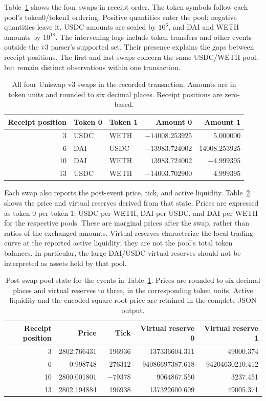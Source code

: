 \documentclass[11pt]{article}
\begin{document}
Table~\ref{tab:example} shows the four swaps in receipt order. The token symbols
follow each pool's token0/token1 ordering. Positive quantities enter the pool;
negative quantities leave it. USDC amounts are scaled by $10^6$, and DAI and WETH
amounts by $10^{18}$. The intervening logs include token transfers and other events
outside the v3 parser's supported set. Their presence explains the gaps between
receipt positions. The first and last swaps concern the same USDC/WETH pool, but
remain distinct observations within one transaction.

\begin{table}[!htbp]
\centering
\small
\begin{tabular}{rllrr}
\toprule
Receipt position & Token 0 & Token 1 & Amount 0 & Amount 1 \\
\midrule
3  & USDC & WETH & $-14008.253925$ & $5.000000$ \\
6  & DAI  & USDC & $-13983.724002$ & $14008.253925$ \\
10 & DAI  & WETH & $13983.724002$ & $-4.999395$ \\
13 & USDC & WETH & $-14003.702900$ & $4.999395$ \\
\bottomrule
\end{tabular}
\caption{All four Uniswap v3 swaps in the recorded transaction. Amounts are in token
units and rounded to six decimal places. Receipt positions are zero-based.}
\label{tab:example}
\end{table}

Each swap also reports the post-event price, tick, and active liquidity.
Table~\ref{tab:swap-state} shows the price and virtual reserves derived from that
state. Prices are expressed as token 0 per token 1: USDC per WETH, DAI per USDC,
and DAI per WETH for the respective pools. These are marginal prices after the
swap, rather than ratios of the exchanged amounts. Virtual reserves characterize
the local trading curve at the reported active liquidity; they are not the pool's
total token balances. In particular, the large DAI/USDC virtual reserves should not
be interpreted as assets held by that pool.

\begin{table}[!htbp]
\centering
\small
\begin{tabular}{@{}rrrrr@{}}
\toprule
Receipt position & Price & Tick & Virtual reserve 0 & Virtual reserve 1 \\
\midrule
3  & 2802.766431 & 196936  & 137336604.311 & 49000.374 \\
6  & 0.998748    & $-276312$ & 94086697387.618 & 94204630210.412 \\
10 & 2800.001801 & $-79378$  & 9064867.550 & 3237.451 \\
13 & 2802.194884 & 196938  & 137322600.609 & 49005.371 \\
\bottomrule
\end{tabular}
\caption{Post-swap pool state for the events in Table~\ref{tab:example}. Prices are
rounded to six decimal places and virtual reserves to three, in the corresponding
token units. Active liquidity and the encoded square-root price are retained in
the complete JSON output.}
\label{tab:swap-state}
\end{table}
\end{document}
